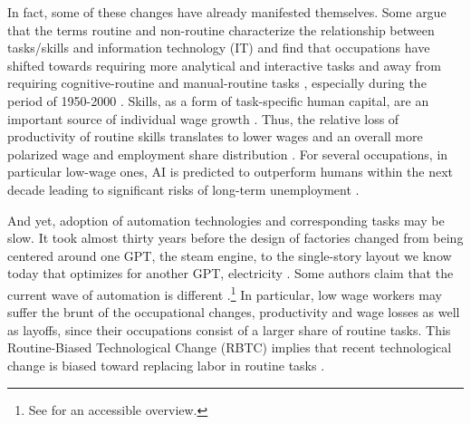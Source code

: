 \documentclass[letterpaper]{article} %
\begin{document}
In fact, some of these changes have already manifested themselves. Some argue that the terms routine and non-routine characterize the relationship between tasks/skills and information technology (IT) and find that occupations have shifted towards requiring more analytical and interactive tasks and away from requiring cognitive-routine and manual-routine tasks \cite{Spitz-Oener2006}, especially during the period of 1950-2000 \cite{atalay2019evolution}. Skills, as a form of task-specific human capital, are an important source of individual wage growth \cite{Gathmann2010}. Thus, the relative loss of productivity of routine skills translates to lower wages and an overall more polarized wage and employment share distribution \cite{AutorDorn2013}. For several occupations, in particular low-wage ones, AI is predicted to outperform humans within the next decade  leading to significant risks of long-term unemployment \cite{grace2018will} \cite{depredicting}.
\par
And yet, adoption of automation technologies and corresponding tasks may be slow. It took almost thirty years before the design of factories changed from being centered around one GPT, the steam engine, to the single-story layout we know today that optimizes for another GPT, electricity \cite{BrynjolfssonMcAfee2014}. Some authors claim that the current wave of automation is different \cite{duckworth2019inferring}.\footnote{See \cite{wajcman2017automation} for an accessible overview.}
In particular, low wage workers may suffer the brunt of the occupational changes, productivity and wage losses as well as layoffs, since their occupations consist of a larger share of routine tasks. This Routine-Biased Technological Change (RBTC) implies that recent technological change is biased toward replacing labor in routine tasks \cite{GoosManningSalomons2014}.
\end{document}
